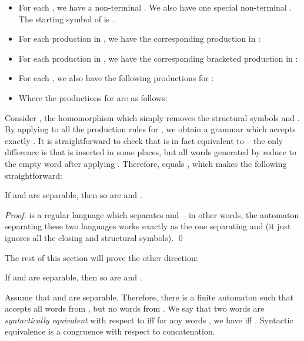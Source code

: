 \documentclass{article}
\begin{document}
\begin{itemize}
\item For each , we have a non-terminal . We also
have one special non-terminal . The starting symbol of  is .

\item For each production  in , we have the corresponding production in :


\item For each production  in , we have the corresponding
bracketed production in :


\item For each , we also have the following productions for :


\item Where the productions for  are as follows:


\end{itemize}

Consider , the homomorphism which simply
removes the structural symbols  and . By applying
 to all the production rules for , we obtain a grammar  which
accepts exactly . It is straightforward to check that  is
in fact equivalent to  -- the only difference is that  is inserted in some
places, but all words generated by  reduce to the empty word after applying .
Therefore,  equals , which makes the following straightforward:

\begin{lemma}\label{easydir}
If  and  are separable, then so are  and .
\end{lemma}

\begin{proof}
 is a regular language
which separates  and  -- in other words, the automaton separating
these two languages works exactly as the one separating  and 
(it just ignores all the closing and structural symbols). \qed
\end{proof}

The rest of this section will prove the other direction:

\begin{theorem}\label{harddir}
If  and  are separable, then so are  and .
\end{theorem}

Assume that  and  are separable. Therefore, there is a finite automaton
 such that  accepts all words from , but no words from . We say
that two words  are {\it syntactically equivalent} with respect to 
iff for any words , we have  iff .
Syntactic equivalence is a congruence with respect to concatenation.
\end{document}
